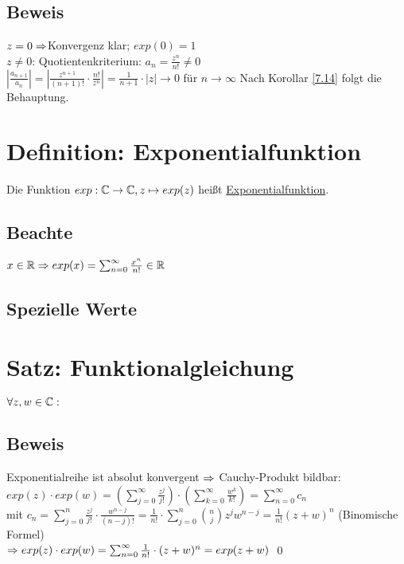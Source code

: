 \subsection*{Beweis}
$z = 0 \Rightarrow $Konvergenz klar; $exp(0)=1$\\
$z \neq 0$: Quotientenkriterium: $a_n = \frac{z^n}{n!} \neq 0$\\
$\left|\frac{a_{n+1}}{a_n}\right| = \left|\frac{z^{n+1}}{(n+1)!} \cdot \frac{n!}{z^n}\right| = \frac{1}{n+1} \cdot |z| \to 0$ für $n \to \infty$\nl
Nach Korollar \ref{7.14} folgt die Behauptung.

\newpage

\section{Definition: Exponentialfunktion}\label{8.9}
Die Funktion $exp: \mathbb{C} \to \mathbb{C}, z \mapsto exp(z)$ heißt \underline{Exponentialfunktion}.

\subsection*{Beachte}
$x \in \mathbb{R} \Rightarrow exp(x)=\sum_{n=0}^\infty \frac{x^n}{n!} \in \mathbb{R}$

\subsection*{Spezielle Werte}

\section{Satz: Funktionalgleichung}\label{8.10}
$\forall z,w \in \mathbb{C}:$ 

\subsection*{Beweis}
Exponentialreihe ist absolut konvergent $\Rightarrow$ Cauchy-Produkt bildbar:\\
$exp(z) \cdot exp(w) = \left(\sum_{j=0}^\infty \frac{z^j}{j!}\right) \cdot \left(\sum_{k=0}^\infty \frac{w^k}{k!}\right) = \sum_{n=0}^\infty c_n$\\
mit $c_n = \sum_{j=0}^n \frac{z^j}{j!} \cdot \frac{w^{n-j}}{(n-j)!} = \frac{1}{n!} \cdot \sum_{j=0}^n \binom{n}{j} z^j w^{n-j} = \frac{1}{n!} (z+w)^n$ (Binomische Formel)\\
$\Rightarrow exp(z) \cdot exp(w) = \sum_{n=0}^\infty \frac{1}{n!} \cdot (z+w)^n = exp(z+w)$ \qed

